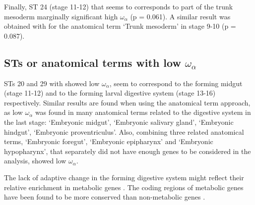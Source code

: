 Finally, ST 24 (stage 11-12) that seems to corresponds to part of the trunk mesoderm marginally significant high $\omega_{\alpha}$ (p = 0.061). A similar result was obtained with for the anatomical term `Trunk mesoderm' in stage 9-10 (p =
0.087).

\subsection{STs or anatomical terms with low $\omega_{\alpha}$}
STs 20 and 29 with showed low $\omega_{\alpha}$, seem to correspond to the forming midgut (stage 11-12) and to the forming larval digestive system (stage 13-16) respectively.
Similar results are found when using the anatomical term approach, as low $\omega_{\alpha}$ was found in many anatomical terms related to the digestive system in the last stage: `Embryonic midgut', `Embryonic salivary gland', `Embryonic hindgut', `Embryonic proventriculus'. 
Also, combining three related anatomical terms, `Embryonic foregut', `Embryonic epipharynx' and `Embryonic hypopharynx', that separately did not have enough genes to be considered in the analysis, showed low $\omega_{\alpha}$. 

The lack of adaptive change in the forming digestive system might reflect their relative enrichment in metabolic genes \citep{Marianes2013}. The coding regions of metabolic genes have been found to be more conserved than non-metabolic genes \citep{Peregrin-Alvarez2009}.

